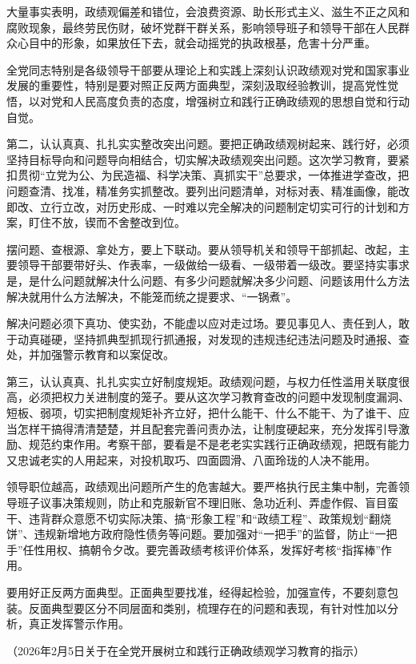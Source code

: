 \documentclass[UTF8,zihao=-4]{ctexart}
\begin{document}
大量事实表明，政绩观偏差和错位，会浪费资源、助长形式主义、滋生不正之风和腐败现象，最终劳民伤财，破坏党群干群关系，影响领导班子和领导干部在人民群众心目中的形象，如果放任下去，就会动摇党的执政根基，危害十分严重。

全党同志特别是各级领导干部要从理论上和实践上深刻认识政绩观对党和国家事业发展的重要性，特别是要对照正反两方面典型，深刻汲取经验教训，提高党性觉悟，以对党和人民高度负责的态度，增强树立和践行正确政绩观的思想自觉和行动自觉。

第二，认认真真、扎扎实实整改突出问题。要把正确政绩观树起来、践行好，必须坚持目标导向和问题导向相结合，切实解决政绩观突出问题。这次学习教育，要紧扣贯彻“立党为公、为民造福、科学决策、真抓实干”总要求，一体推进学查改，把问题查清、找准，精准务实抓整改。要列出问题清单，对标对表、精准画像，能改即改、立行立改，对历史形成、一时难以完全解决的问题制定切实可行的计划和方案，盯住不放，锲而不舍整改到位。

摆问题、查根源、拿处方，要上下联动。要从领导机关和领导干部抓起、改起，主要领导干部要带好头、作表率，一级做给一级看、一级带着一级改。要坚持实事求是，是什么问题就解决什么问题、有多少问题就解决多少问题、问题该用什么方法解决就用什么方法解决，不能笼而统之提要求、“一锅煮”。

解决问题必须下真功、使实劲，不能虚以应对走过场。要见事见人、责任到人，敢于动真碰硬，坚持抓典型抓现行抓通报，对发现的违规违纪违法问题及时通报、查处，并加强警示教育和以案促改。

第三，认认真真、扎扎实实立好制度规矩。政绩观问题，与权力任性滥用关联度很高，必须把权力关进制度的笼子。要从这次学习教育查改的问题中发现制度漏洞、短板、弱项，切实把制度规矩补齐立好，把什么能干、什么不能干、为了谁干、应当怎样干搞得清清楚楚，并且配套完善问责办法，让制度硬起来，充分发挥引导激励、规范约束作用。考察干部，要看是不是老老实实践行正确政绩观，把既有能力又忠诚老实的人用起来，对投机取巧、四面圆滑、八面玲珑的人决不能用。

领导职位越高，政绩观出问题所产生的危害越大。要严格执行民主集中制，完善领导班子议事决策规则，防止和克服新官不理旧账、急功近利、弄虚作假、盲目蛮干、违背群众意愿不切实际决策、搞“形象工程”和“政绩工程”、政策规划“翻烧饼”、违规新增地方政府隐性债务等问题。要加强对“一把手”的监督，防止“一把手”任性用权、搞朝令夕改。要完善政绩考核评价体系，发挥好考核“指挥棒”作用。

要用好正反两方面典型。正面典型要找准，经得起检验，加强宣传，不要刻意包装。反面典型要区分不同层面和类别，梳理存在的问题和表现，有针对性加以分析，真正发挥警示作用。

（2026年2月5日关于在全党开展树立和践行正确政绩观学习教育的指示）
\end{document}
